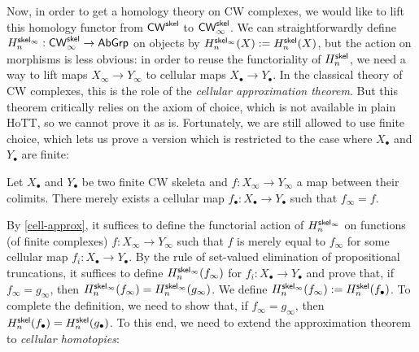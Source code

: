 \documentclass[a4page]{article}
\begin{document}
Now, in order to get a homology theory on CW complexes, we would like to lift
this homology functor from $\textnormal{\ensuremath{\mathsf{CW}^{\mathsf{skel}}}}$ to $\textnormal{\ensuremath{\mathsf{CW}_\infty^{\mathsf{skel}}}}$.
%
We can straightforwardly define $\textnormal{\ensuremath{H^{\mathsf{skel}_\infty}_{n}}} : \textnormal{\ensuremath{\mathsf{CW}_\infty^{\mathsf{skel}}}} \to \textnormal{\ensuremath{\mathsf{AbGrp}}}$ on
objects by $\textnormal{\ensuremath{H^{\mathsf{skel}_\infty}_{n}}}(X) := H_n^{\mathsf{skel}}(X)$, but the action on
morphisms is less obvious: in order to reuse the functoriality of $\textnormal{\ensuremath{H^{\mathsf{skel}}_{n}}}$,
we need a way to lift maps $X_\infty \to Y_\infty$ to cellular maps
$X_\bullet \to Y_\bullet$.
%
In the classical theory of CW complexes, this is the role of the \emph{cellular
approximation theorem}.
%
But this theorem critically relies on the axiom of choice, which is
not available in plain HoTT, so we cannot prove it as is.
%
Fortunately, we are still allowed to use finite choice, which lets us prove a
version which is restricted to the case where $X_\bullet$ and $Y_\bullet$ are
finite:
%
\begin{theorem}\label{cell-approx}
  Let $X_\bullet$ and $Y_\bullet$ be two finite CW skeleta and
  $f : X_{\infty} \to Y_{\infty}$ a map between their colimits.
  There merely exists a cellular map $f_\bullet : X_\bullet \to Y_\bullet$ such
  that $f_\infty = f$.
\end{theorem}
%
By \cref{cell-approx}, it suffices to define the functorial action of
$\textnormal{\ensuremath{H^{\mathsf{skel}_\infty}_{n}}}$ on functions (of finite complexes) $f : X_\infty \to Y_\infty$
such that $f$ is merely equal to $f_\infty$ for some cellular map
$f_i : X_\bullet \to Y_\bullet$.
%
By the rule of set-valued elimination of propositional truncations, it
suffices to define $\textnormal{\ensuremath{H^{\mathsf{skel}_\infty}_{n}}}(f_\infty)$ for $f_i : X_\bullet \to Y_\bullet$
and prove that, if $f_\infty = g_\infty$, then
$\textnormal{\ensuremath{H^{\mathsf{skel}_\infty}_{n}}}(f_\infty) = \textnormal{\ensuremath{H^{\mathsf{skel}_\infty}_{n}}}(g_\infty)$.
%
We define $\textnormal{\ensuremath{H^{\mathsf{skel}_\infty}_{n}}}(f_\infty) := \textnormal{\ensuremath{H^{\mathsf{skel}}_{n}}}(f_\bullet)$. To complete the
definition, we need to show that, if $f_\infty = g_\infty$, then
$\textnormal{\ensuremath{H^{\mathsf{skel}}_{n}}}(f_\bullet) = \textnormal{\ensuremath{H^{\mathsf{skel}}_{n}}}(g_\bullet)$. To this end, we need
to extend the approximation theorem to \emph{cellular homotopies}:
%
\end{document}
